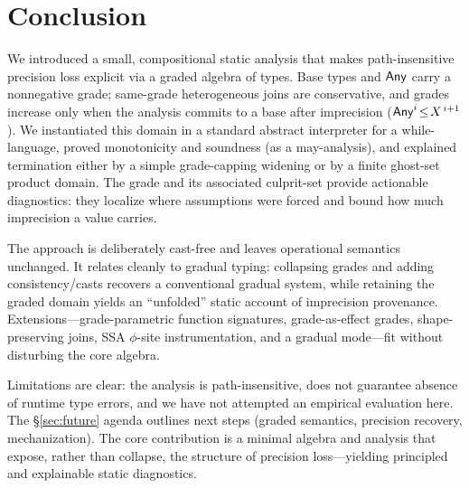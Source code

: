 \section{Conclusion}
\label{sec:conclusion}

We introduced a small, compositional static analysis that makes path-insensitive precision loss explicit via a graded algebra of types. Base types and $\mathsf{Any}$ carry a nonnegative grade; same-grade heterogeneous joins are conservative, and grades increase only when the analysis commits to a base after imprecision ($\mathsf{Any}^{i}\!\le\!X^{\,i+1}$). We instantiated this domain in a standard abstract interpreter for a \textsf{while}-language, proved monotonicity and soundness (as a may-analysis), and explained termination either by a simple grade-capping widening or by a finite ghost-set product domain. The grade and its associated culprit-set provide actionable diagnostics: they localize where assumptions were forced and bound how much imprecision a value carries.

The approach is deliberately cast-free and leaves operational semantics unchanged. It relates cleanly to gradual typing: collapsing grades and adding consistency/casts recovers a conventional gradual system, while retaining the graded domain yields an ``unfolded'' static account of imprecision provenance. Extensions—grade-parametric function signatures, grade-as-effect grades, shape-preserving joins, SSA $\phi$-site instrumentation, and a gradual mode—fit without disturbing the core algebra.

Limitations are clear: the analysis is path-insensitive, does not guarantee absence of runtime type errors, and we have not attempted an empirical evaluation here. The \S\ref{sec:future} agenda outlines next steps (graded semantics, precision recovery, mechanization). The core contribution is a minimal algebra and analysis that expose, rather than collapse, the structure of precision loss—yielding principled and explainable static diagnostics.
